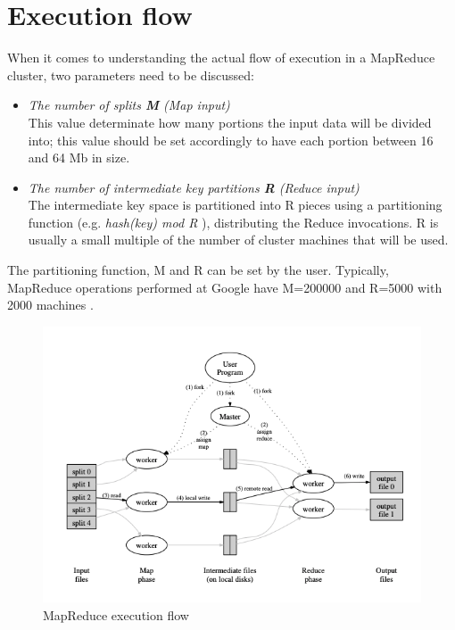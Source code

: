 \section{Execution flow}
When it comes to understanding the actual flow of execution in a MapReduce cluster, two parameters need to be discussed:
\begin{itemize}
    \item \textit{The number of splits \textbf{M} (Map input)}\\
    This value determinate how many portions the input data will be divided into; this value should be set accordingly to have each portion between 16 and 64 Mb in size.
    \item \textit{The number of intermediate key partitions \textbf{R} (Reduce input)}\\
    The intermediate key space is partitioned into R pieces using a partitioning function (e.g. \textit{hash(key) mod R} \cite{google_mapreduce}), distributing the Reduce invocations. R is usually a small multiple of the number of cluster machines that will be used.
\end{itemize}
The partitioning function, M and R can be set by the user. Typically, MapReduce operations performed at Google have M=200000 and R=5000 with 2000 machines \cite{google_mapreduce}.

\begin{figure}[H]
    \centering
    \includegraphics[scale=0.75]{document/chapters/chapter_4/images/mapreduce_execution_flow.png}
    \caption{MapReduce execution flow \cite{google_mapreduce}}
    \label{fig:mapreduce_execution_flow}
\end{figure}

